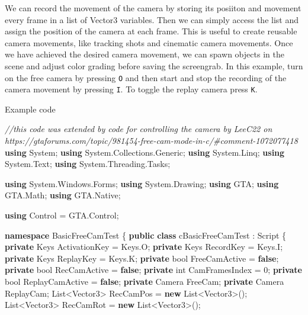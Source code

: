 \documentclass[
  openany]{book}
\newenvironment{Shaded}{\begin{snugshade}}{\end{snugshade}}
\newcommand{\CommentTok}[1]{\textcolor[rgb]{0.56,0.35,0.01}{\textit{#1}}}
\newcommand{\DataTypeTok}[1]{\textcolor[rgb]{0.13,0.29,0.53}{#1}}
\newcommand{\DecValTok}[1]{\textcolor[rgb]{0.00,0.00,0.81}{#1}}
\newcommand{\FunctionTok}[1]{\textcolor[rgb]{0.00,0.00,0.00}{#1}}
\newcommand{\KeywordTok}[1]{\textcolor[rgb]{0.13,0.29,0.53}{\textbf{#1}}}
\newcommand{\NormalTok}[1]{#1}
\begin{document}
We can record the movement of the camera by storing its posiiton and movement every frame in a list of Vector3 variables. Then we can simply access the list and assign the position of the camera at each frame. This is useful to create reusable camera movements, like tracking shots and cinematic camera movements. Once we have achieved the desired camera movement, we can spawn objects in the scene and adjust color grading before saving the screengrab.
In this example, turn on the free camera by pressing \texttt{O} and then start and stop the recording of the camera movement by pressing \texttt{I}. To toggle the replay camera press \texttt{K}.

Example code

\begin{Shaded}
\begin{Highlighting}[]
\CommentTok{//this code was extended by code for controlling the camera by LeeC22 on https://gtaforums.com/topic/981454-free-cam-mode-in-c/#comment-1072077418}
\KeywordTok{using}\NormalTok{ System;}
\KeywordTok{using}\NormalTok{ System.}\FunctionTok{Collections}\NormalTok{.}\FunctionTok{Generic}\NormalTok{;}
\KeywordTok{using}\NormalTok{ System.}\FunctionTok{Linq}\NormalTok{;}
\KeywordTok{using}\NormalTok{ System.}\FunctionTok{Text}\NormalTok{;}
\KeywordTok{using}\NormalTok{ System.}\FunctionTok{Threading}\NormalTok{.}\FunctionTok{Tasks}\NormalTok{;}
    
\KeywordTok{using}\NormalTok{ System.}\FunctionTok{Windows}\NormalTok{.}\FunctionTok{Forms}\NormalTok{;}
\KeywordTok{using}\NormalTok{ System.}\FunctionTok{Drawing}\NormalTok{;}
\KeywordTok{using}\NormalTok{ GTA;}
\KeywordTok{using}\NormalTok{ GTA.}\FunctionTok{Math}\NormalTok{;}
\KeywordTok{using}\NormalTok{ GTA.}\FunctionTok{Native}\NormalTok{;}


\KeywordTok{using}\NormalTok{ Control = GTA.}\FunctionTok{Control}\NormalTok{;}

\KeywordTok{namespace}\NormalTok{ BasicFreeCamTest}
\NormalTok{\{}
    \KeywordTok{public} \KeywordTok{class}\NormalTok{ cBasicFreeCamTest : Script}
\NormalTok{    \{}
        \KeywordTok{private}\NormalTok{ Keys ActivationKey = Keys.}\FunctionTok{O}\NormalTok{;}
        \KeywordTok{private}\NormalTok{ Keys RecordKey = Keys.}\FunctionTok{I}\NormalTok{;}
        \KeywordTok{private}\NormalTok{ Keys ReplayKey = Keys.}\FunctionTok{K}\NormalTok{;}
        \KeywordTok{private} \DataTypeTok{bool}\NormalTok{ FreeCamActive = }\KeywordTok{false}\NormalTok{;}
        \KeywordTok{private} \DataTypeTok{bool}\NormalTok{ RecCamActive = }\KeywordTok{false}\NormalTok{;}
        \KeywordTok{private} \DataTypeTok{int}\NormalTok{ CamFramesIndex = }\DecValTok{0}\NormalTok{;}
        \KeywordTok{private} \DataTypeTok{bool}\NormalTok{ ReplayCamActive = }\KeywordTok{false}\NormalTok{;}
        \KeywordTok{private}\NormalTok{ Camera FreeCam;}
        \KeywordTok{private}\NormalTok{ Camera ReplayCam;}
\NormalTok{        List<Vector3> RecCamPos = }\KeywordTok{new}\NormalTok{ List<Vector3>();}
\NormalTok{        List<Vector3> RecCamRot = }\KeywordTok{new}\NormalTok{ List<Vector3>();}


\end{Highlighting}
\end{Shaded}
\end{document}
